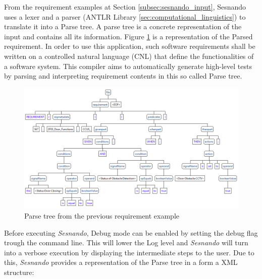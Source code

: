 From the requirement examples at Section \ref{subsec:sesnando_input}, Sesnando uses a lexer and a parser (ANTLR Library \ref{sec:computational_linguistics}) to translate it into a Parse tree. A parse tree is a concrete representation of the input and contains all its information. Figure \ref{fig:req_parse_tree} is a representation of the Parsed requirement.
In order to use this application, such software requirements shall be written on a controlled natural language (CNL) that define the functionalities of a software system. This compiler aims to automatically generate high-level tests by parsing and interpreting requirement contents in this so called Parse tree.

\begin{figure}[H]
    \centering
    \includegraphics[scale=0.625]{images/parse_tree_req_example.PNG}
    \caption{Parse tree from the previous requirement example}
    \label{fig:req_parse_tree}
\end{figure}


Before executing \textit{Sesnando}, Debug mode can be enabled by setting the debug flag trough the command line. This will lower the Log level and \textit{Sesnando} will turn into a verbose execution by displaying the intermediate steps to the user. Due to this, \textit{Sesnando} provides a representation of the Parse tree in a form a XML structure: \\

